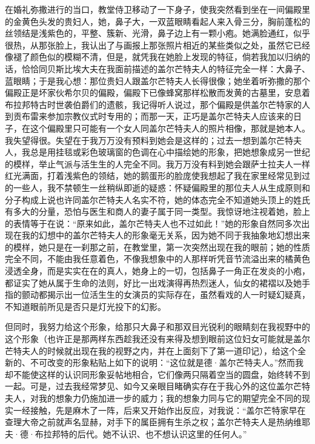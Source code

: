 \par 在婚礼弥撒进行的当口，教堂侍卫移动了一下身子，使我突然看到坐在一间偏殿里的金黄色头发的贵妇人，她，鼻子大，一双蓝眼睛看起人来入骨三分，胸前蓬松的丝领结是浅紫色的，平整、簇新、光滑，鼻子边上有一颗小疱。她满脸通红，似乎很热，从那张脸上，我认出了与画报上那张照片相近的某些类似之处，虽然它已经像褪了颜色似的模糊不清，但是，就凭我在她脸上发现的特征，倘若我加以归纳的话，恰恰同贝斯比埃大夫在我面前描述的盖尔芒特夫人的特征完全一样：大鼻子、蓝眼睛；于是我心想：那位贵妇人跟盖尔芒特夫人长得很像；她坐着听弥撒的那个偏殿正是坏家伙希尔贝的偏殿，偏殿下已像蜂窝那样松散而发黄的古墓里，安息着布拉邦特古时世袭伯爵们的遗骸，我记得听人说过，那个偏殿是供盖尔芒特家的人到贡布雷来参加宗教仪式时专用的；而那一天，正巧是盖尔芒特夫人应该来的日子，在这个偏殿里只可能有一个女人同盖尔芒特夫人的照片相像，那就是她本人。我失望得很。失望在于我万万没有预料到她会是这样的；过去一想到盖尔芒特夫人，我总是用挂毯或彩色玻璃窗的色调在心中描绘她的形象，把她想象成另一世纪的模样，举止气派与活生生的人完全不同。我万万没有料到她会跟萨士拉夫人一样红光满面，打着浅紫色的领结，她的鹅蛋形的脸庞使我想起了我在家里经常见到过的一些人，我不禁顿生一丝稍纵即逝的疑惑：怀疑偏殿里的那位夫人从生成原则和分子构成上说也许同盖尔芒特夫人名实不符，她的体态完全不知道她头顶上的姓氏有多大的分量，恐怕与医生和商人的妻子属于同一类型。我惊讶地注视着她，脸上的表情等于在说：“原来如此，盖尔芒特夫人也不过如此！”她的形象自然同多次出现在我的幻想中的盖尔芒特夫人的形象毫无关系，因为她不同于我抽象地幻想出来的模样，她只是在一刹那之前，在教堂里，第一次突然出现在我的眼前；她的性质完全不同，不能由我任意着色，不像我想象中的人那样听凭音节流溢出来的橘黄色浸透全身，而是实实在在的真人，她身上的一切，包括鼻子一角正在发炎的小疱，都证实了她从属于生命的法则，好比一出戏演得再热烈迷人，仙女的裙褶以及她手指的颤动都揭示出一位活生生的女演员的实际存在，虽然看戏的人一时疑幻疑真，不知道眼前所见是否只是灯光投下的幻影。
\par 但同时，我努力给这个形象，给那只大鼻子和那双目光锐利的眼睛刻在我视野中的这个形象（也许正是那两样东西趁我还没有来得及想到眼前这位妇女可能就是盖尔芒特夫人的时候就出现在我的视野之内，并在上面刻下了第一道印记），给这个全新的、不可改变的形象粘贴上如下的说明：“这位就是德·盖尔芒特夫人。”然而我却不能使这样的认识同形象妥帖地相合，它们像两只隔着空当的圆盘，始终转不到一起。可是，过去我经常梦见、如今又亲眼目睹确实存在于我心外的这位盖尔芒特夫人，对我的想象力仍施加进一步的威力；我的想象力同与它的期望完全不同的现实一经接触，先是麻木了一阵，后来又开始作出反应，对我说：“盖尔芒特家早在查理大帝之前就声名显赫，对手下的属臣拥有生杀之权；盖尔芒特夫人是热纳维耶夫·德·布拉邦特的后代。她不认识、也不想认识这里的任何人。”
